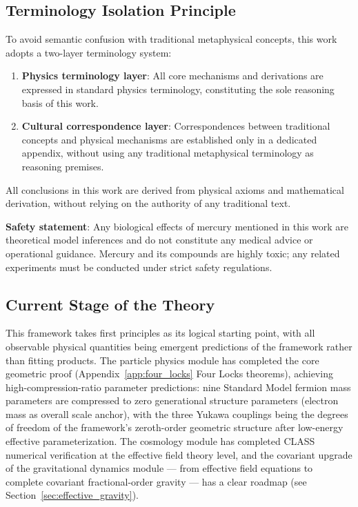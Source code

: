 \documentclass[12pt,a4paper,twocolumn]{article}
\begin{document}
\subsection{Terminology Isolation Principle}
To avoid semantic confusion with traditional metaphysical concepts, this work adopts a two-layer terminology system:
\begin{enumerate}
\item \textbf{Physics terminology layer}: All core mechanisms and derivations are expressed in standard physics terminology, constituting the sole reasoning basis of this work.
\item \textbf{Cultural correspondence layer}: Correspondences between traditional concepts and physical mechanisms are established only in a dedicated appendix, without using any traditional metaphysical terminology as reasoning premises.
\end{enumerate}
All conclusions in this work are derived from physical axioms and mathematical derivation, without relying on the authority of any traditional text.

\textbf{Safety statement}: Any biological effects of mercury mentioned in this work are theoretical model inferences and do not constitute any medical advice or operational guidance. Mercury and its compounds are highly toxic; any related experiments must be conducted under strict safety regulations.

\subsection{Current Stage of the Theory}
\label{subsec:theory_positioning}
This framework takes first principles as its logical starting point, with all observable physical quantities being emergent predictions of the framework rather than fitting products. The particle physics module has completed the core geometric proof (Appendix~\ref{app:four_locks} Four Locks theorems), achieving high-compression-ratio parameter predictions: nine Standard Model fermion mass parameters are compressed to zero generational structure parameters (electron mass as overall scale anchor), with the three Yukawa couplings being the degrees of freedom of the framework's zeroth-order geometric structure after low-energy effective parameterization. The cosmology module has completed CLASS numerical verification at the effective field theory level, and the covariant upgrade of the gravitational dynamics module --- from effective field equations to complete covariant fractional-order gravity --- has a clear roadmap (see Section~\ref{sec:effective_gravity}).
\end{document}
